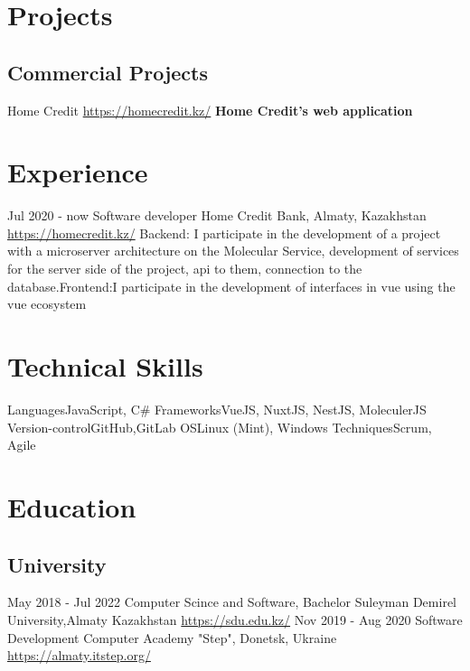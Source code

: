 \documentclass[11pt,a4paper]{moderncv}
\begin{document}
\maketitle

\section{Projects}
  \subsection{Commercial Projects}
  \cvline
    {Home Credit}
    {\url{https://homecredit.kz/}\newline{}
    \textbf{Home Credit's web application}\newline{}
    }
\section{Experience}
\cventry
  {Jul 2020 - now}
  {Software developer}
  {Home Credit Bank, Almaty, Kazakhstan}
  {\newline{}\url{https://homecredit.kz/}}{}
  {Backend: I participate in the development of a project with a microserver architecture on the Molecular  Service,  development of services for the server side of the project, api to them, connection to the    database.\newline Frontend:I participate in the development of interfaces in vue using the vue ecosystem}
\section{Technical Skills}
\cvline
  {Languages}{JavaScript, C\#}
\cvline
  {Frameworks}{VueJS, NuxtJS, NestJS, MoleculerJS}
\cvline
  {Version-control}{GitHub,GitLab}
\cvline
  {OS}{Linux (Mint), Windows}
\cvline
  {Techniques}{Scrum, Agile}

\section{Education}
  \subsection{University}
  \cventry
    {May 2018 - Jul 2022}
    {Computer Scince and Software, Bachelor}
    {Suleyman Demirel University,Almaty Kazakhstan}
    {}{\newline\url{https://sdu.edu.kz/}}{}
  \cventry
    {Nov 2019 - Aug 2020}
    {Software Development}
    {Computer Academy "Step", Donetsk, Ukraine}
    {}{\newline\url{https://almaty.itstep.org/}}{}
\end{document}
